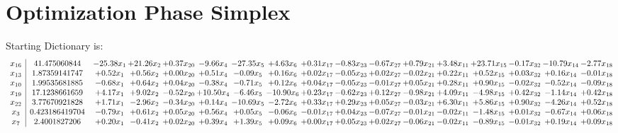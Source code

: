 \documentclass[9pt]{article}
\begin{document}
\section{Optimization Phase Simplex}
Starting Dictionary is:
\[\begin{array}{c| c c@{\hskip 2pt} c@{\hskip 2pt} c@{\hskip 2pt} c@{\hskip 2pt} c@{\hskip 2pt} c@{\hskip 2pt} c@{\hskip 2pt} c@{\hskip 2pt} c@{\hskip 2pt} c@{\hskip 2pt} c@{\hskip 2pt} c@{\hskip 2pt} c@{\hskip 2pt} c@{\hskip 2pt} c@{\hskip 2pt} }
 x_{16}   &  41.475060844 & -25.38 x_{1} & + 21.26 x_{2} & +  0.37 x_{20} & -9.66 x_{4} & -27.35 x_{5} & +  4.63 x_{6} & +  0.31 x_{17} & -0.83 x_{23} & -0.67 x_{27} & +  0.79 x_{21} & +  3.48 x_{11} & + 23.71 x_{15} & -0.17 x_{32} & -10.79 x_{14} & -2.77 x_{18}\\
 x_{13}   &  1.87359141747 & +  0.52 x_{1} & +  0.56 x_{2} & +  0.00 x_{20} & +  0.51 x_{4} & -0.09 x_{5} & +  0.16 x_{6} & +  0.02 x_{17} & -0.05 x_{23} & +  0.02 x_{27} & -0.02 x_{21} & +  0.22 x_{11} & +  0.52 x_{15} & +  0.03 x_{32} & +  0.16 x_{14} & -0.01 x_{18}\\
 x_{10}   &  1.99535681885 & -0.68 x_{1} & +  0.64 x_{2} & +  0.04 x_{20} & -0.38 x_{4} & -0.71 x_{5} & +  0.12 x_{6} & +  0.04 x_{17} & -0.05 x_{23} & -0.01 x_{27} & +  0.05 x_{21} & +  0.28 x_{11} & +  0.90 x_{15} & -0.02 x_{32} & -0.52 x_{14} & -0.09 x_{18}\\
 x_{19}   &  17.1238661659 & +  4.17 x_{1} & +  9.02 x_{2} & -0.52 x_{20} & + 10.50 x_{4} & -6.46 x_{5} & -10.90 x_{6} & +  0.23 x_{17} & -0.62 x_{23} & +  0.12 x_{27} & -0.98 x_{21} & +  4.09 x_{11} & -4.98 x_{15} & +  0.42 x_{32} & -1.14 x_{14} & +  0.42 x_{18}\\
 x_{22}   &  3.77670921828 & +  1.71 x_{1} & -2.96 x_{2} & -0.34 x_{20} & +  0.14 x_{4} & -10.69 x_{5} & -2.72 x_{6} & +  0.33 x_{17} & +  0.29 x_{23} & +  0.05 x_{27} & -0.03 x_{21} & +  6.30 x_{11} & +  5.86 x_{15} & +  0.90 x_{32} & -4.26 x_{14} & +  0.52 x_{18}\\
 x_{3}   &  0.423186419704 & -0.79 x_{1} & +  0.61 x_{2} & +  0.05 x_{20} & +  0.56 x_{4} & +  0.05 x_{5} & -0.06 x_{6} & -0.01 x_{17} & +  0.04 x_{23} & -0.07 x_{27} & -0.01 x_{21} & -0.02 x_{11} & -1.48 x_{15} & +  0.01 x_{32} & -0.67 x_{14} & +  0.06 x_{18}\\
 x_{7}   &  2.4001827206 & +  0.20 x_{1} & -0.41 x_{2} & +  0.02 x_{20} & +  0.39 x_{4} & +  1.39 x_{5} & +  0.09 x_{6} & +  0.00 x_{17} & +  0.05 x_{23} & +  0.02 x_{27} & -0.06 x_{21} & -0.02 x_{11} & -0.89 x_{15} & -0.01 x_{32} & +  0.19 x_{14} & +  0.09 x_{18}\\

\end{array}\]
\end{document}
